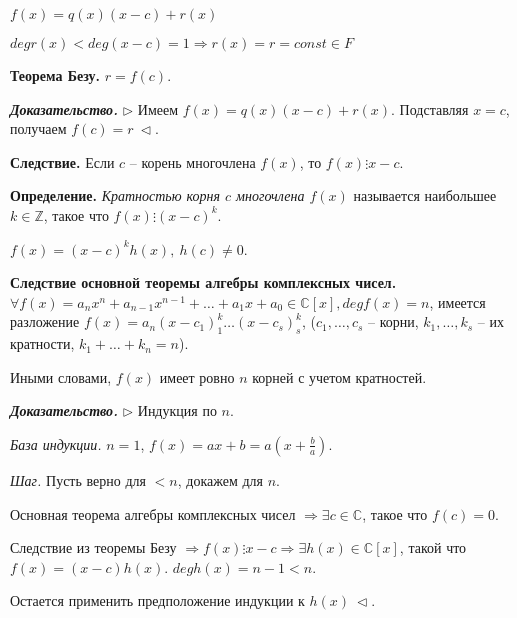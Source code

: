 $f(x) = q(x) (x - c) + r(x)$

$deg r(x) < deg (x - c) = 1 \Rightarrow r(x) = r = const \in F$

\vspace{\baselineskip}
\textbf{Теорема Безу.} $r = f(c)$.

\vspace{\baselineskip}
\textbf{\textit{Доказательство.}} $\rhd$ Имеем $f(x) = q(x)(x - c) + r(x)$. Подставляя $x=c$, получаем $f(c) = r \ \lhd$.

\vspace{\baselineskip}
\textbf{Следствие.} Если $c$ -- корень многочлена $f(x)$, то $f(x) \vdots x - c$.

\vspace{\baselineskip}
\textbf{Определение.} \textit{Кратностью корня $c$ многочлена $f(x)$} называется наибольшее $k \in \mathbb{Z}$, такое что $f(x) \vdots (x - c)^k$.

$f(x) = (x - c)^k h(x), \ h(c) \neq 0$.

\vspace{\baselineskip}
\textbf{Следствие основной теоремы алгебры комплексных чисел.} $\forall f(x) = a_n x^n + a_{n-1} x^{n-1} + \dots + a_1 x + a_0 \in \mathbb{C}[x], deg f(x) = n$, имеется разложение $f(x) = a_n (x - c_1)^k_1
\dots (x - c_s)^k_s$, ($c_1, \dots, c_s$ -- корни, $k_1, \dots, k_s$ -- их кратности, $k_1 + \dots + k_n = n$).

\vspace{\baselineskip}
Иными словами, $f(x)$ имеет ровно $n$ корней с учетом кратностей.

\vspace{\baselineskip}
\textbf{\textit{Доказательство.}} $\rhd$ Индукция по $n$.

\textit{База индукции.} $n = 1$, $f(x) = ax + b = a (x + \frac{b}{a})$.

\textit{Шаг.} Пусть верно для $<n$, докажем для $n$.

Основная теорема алгебры комплексных чисел $\Rightarrow \exists c \in \mathbb{C}$, такое что $f(c) = 0$.

Следствие из теоремы Безу $\Rightarrow f(x) \vdots x - c \Rightarrow \exists h(x) \in \mathbb{C}[x]$, такой что $f(x) = (x-c)h(x)$. $degh(x) = n-1 < n$.

Остается применить предположение индукции к $h(x) \ \lhd$.

